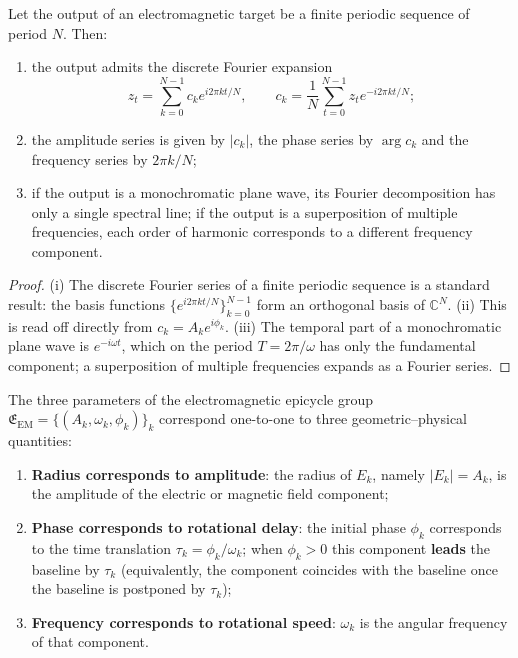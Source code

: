 \begin{theorem}\label{thm:em_series_reconstruction}
Let the output of an electromagnetic target be a finite periodic sequence of period $N$. Then:
\begin{enumerate}[label=(\roman*)]
    \item the output admits the discrete Fourier expansion
    \[
    z_t=\sum_{k=0}^{N-1}c_k e^{i2\pi kt/N},\qquad
    c_k=\frac1N\sum_{t=0}^{N-1}z_t e^{-i2\pi kt/N};
    \]
    \item the amplitude series is given by $|c_k|$, the phase series by $\arg c_k$ and the frequency series by $2\pi k/N$;
    \item if the output is a monochromatic plane wave, its Fourier decomposition has only a single spectral line; if the output is a superposition of multiple frequencies, each order of harmonic corresponds to a different frequency component.
\end{enumerate}
\end{theorem}

\begin{proof}
(i) The discrete Fourier series of a finite periodic sequence is a standard result: the basis functions $\{e^{i2\pi kt/N}\}_{k=0}^{N-1}$ form an orthogonal basis of $\mathbb C^N$.
(ii) This is read off directly from $c_k=A_k e^{i\phi_k}$.
(iii) The temporal part of a monochromatic plane wave is $e^{-i\omega t}$, which on the period $T=2\pi/\omega$ has only the fundamental component; a superposition of multiple frequencies expands as a Fourier series.
\end{proof}

\begin{proposition}\label{prop:em_epicycle_correspondence}
The three parameters of the electromagnetic epicycle group $\mathfrak E_{\mathrm{EM}}=\{(A_k,\omega_k,\phi_k)\}_{k}$ correspond one-to-one to three geometric--physical quantities:
\begin{enumerate}[label=(\roman*)]
    \item \textbf{Radius corresponds to amplitude}: the radius of $E_k$, namely $|E_k|=A_k$, is the amplitude of the electric or magnetic field component;
    \item \textbf{Phase corresponds to rotational delay}: the initial phase $\phi_k$ corresponds to the time translation $\tau_k=\phi_k/\omega_k$; when $\phi_k>0$ this component \textbf{leads} the baseline by $\tau_k$ (equivalently, the component coincides with the baseline once the baseline is postponed by $\tau_k$);
    \item \textbf{Frequency corresponds to rotational speed}: $\omega_k$ is the angular frequency of that component.
\end{enumerate}
\end{proposition}

